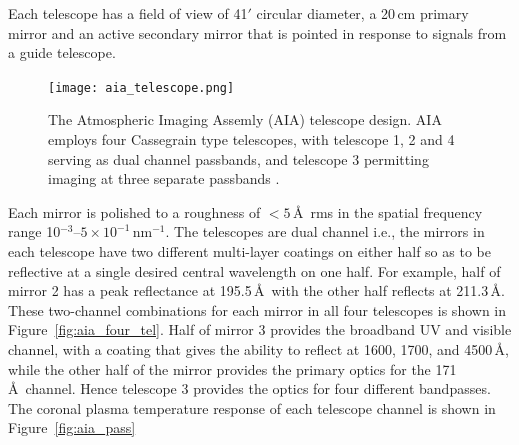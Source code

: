 Each telescope has a field of view of 41$'$ circular diameter, a 20\,cm primary mirror and an active secondary mirror that is pointed in response to signals from a guide telescope. 
\begin{figure}[!t]
\begin{center}
\texttt{[image: aia\_telescope.png]}
\caption[The AIA telescope design]{The Atmospheric Imaging Assemly (AIA) telescope design. AIA employs four Cassegrain type telescopes, with telescope 1, 2 and 4 serving as dual channel passbands, and telescope 3 permitting imaging at three separate passbands \citep{lemen2012}.}
\label{fig:aia_cass}
\end{center}
\end{figure}
Each mirror is polished to a roughness of $<5$\,\AA~rms in the spatial frequency range 10$^{-3}$--$5\times10^{-1}$\,nm$^{-1}$. The telescopes are dual channel i.e., the mirrors in each telescope have two different multi-layer coatings on either half so as to be reflective at a single desired central wavelength on one half. For example, half of mirror 2 has a peak reflectance at 195.5\,\AA~with the other half reflects at 211.3\,\AA. These two-channel combinations for each mirror in all four telescopes is shown in Figure~\ref{fig:aia_four_tel}. Half of mirror 3 provides the broadband UV and visible channel, with a coating that gives the ability to reflect at 1600, 1700, and 4500\,\AA, while the other half of the mirror provides the primary optics for the 171\,\AA~channel. Hence telescope 3 provides the optics for four different bandpasses. The coronal plasma temperature response of each telescope channel is shown in Figure~\ref{fig:aia_pass}

